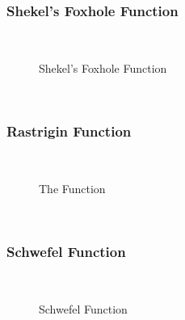 \subsubsection{Shekel's Foxhole Function}
~
\begin{figure}[ht]
	\centering
	\setlength \fboxsep{0pt}
	\setlength \fboxrule{0.5pt}
	\caption{Shekel's Foxhole Function}
	\label{fig:ShekelGraph}
\end{figure}
~
\subsubsection{Rastrigin Function}
~
\begin{figure}[ht]
	\centering
	\setlength \fboxsep{0pt}
	\setlength \fboxrule{0.5pt}
	\caption{The Function}
	\label{fig:RastriginGraph}
\end{figure}
~
\subsubsection{Schwefel Function}
~
\begin{figure}[ht]
	\centering
	\setlength \fboxsep{0pt}
	\setlength \fboxrule{0.5pt}
	\caption{Schwefel Function}
	\label{fig:SchwefelGraph}
\end{figure}
~
